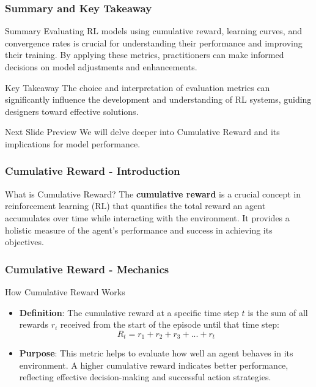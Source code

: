\documentclass{beamer}
\begin{document}
\begin{frame}[fragile]
    \frametitle{Summary and Key Takeaway}
    
    \begin{block}{Summary}
        Evaluating RL models using cumulative reward, learning curves, and convergence rates is crucial for understanding their performance and improving their training. By applying these metrics, practitioners can make informed decisions on model adjustments and enhancements.
    \end{block}
    
    \begin{block}{Key Takeaway}
        The choice and interpretation of evaluation metrics can significantly influence the development and understanding of RL systems, guiding designers toward effective solutions.
    \end{block}
    
    \begin{block}{Next Slide Preview}
        We will delve deeper into Cumulative Reward and its implications for model performance.
    \end{block}
\end{frame}

\begin{frame}[fragile]
    \frametitle{Cumulative Reward - Introduction}
    \begin{block}{What is Cumulative Reward?}
        The \textbf{cumulative reward} is a crucial concept in reinforcement learning (RL) that quantifies the total reward an agent accumulates over time while interacting with the environment. It provides a holistic measure of the agent's performance and success in achieving its objectives.
    \end{block}
\end{frame}

\begin{frame}[fragile]
    \frametitle{Cumulative Reward - Mechanics}
    \begin{block}{How Cumulative Reward Works}
        \begin{itemize}
            \item \textbf{Definition}: The cumulative reward at a specific time step $t$ is the sum of all rewards $r_i$ received from the start of the episode until that time step:
            \begin{equation}
                R_t = r_1 + r_2 + r_3 + ... + r_t
            \end{equation}
            \item \textbf{Purpose}: This metric helps to evaluate how well an agent behaves in its environment. A higher cumulative reward indicates better performance, reflecting effective decision-making and successful action strategies.
        \end{itemize}
    \end{block}
\end{frame}
\end{document}
